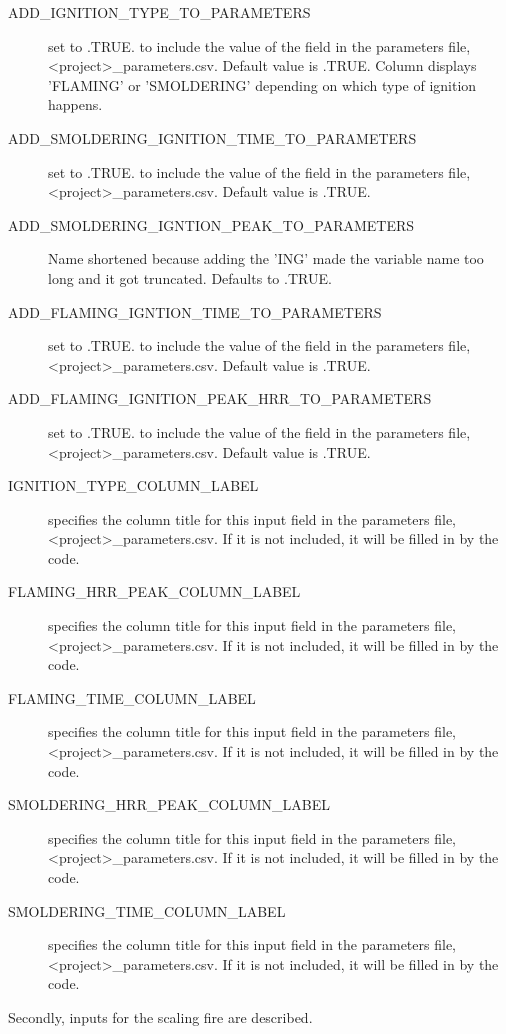 \documentclass[12pt,twoside]{book}
\begin{document}
\begin{description}
  \item[ADD\_IGNITION\_TYPE\_TO\_PARAMETERS] set to .TRUE. to include the value of the field in the parameters file, {\ct <project>\_parameters.csv}. Default value is .TRUE. Column displays 'FLAMING' or 'SMOLDERING' depending on which type of ignition happens.
  \item[ADD\_SMOLDERING\_IGNITION\_TIME\_TO\_PARAMETERS] set to .TRUE. to include the value of the field in the parameters file, {\ct <project>\_parameters.csv}. Default value is .TRUE.
  \item[ADD\_SMOLDERING\_IGNTION\_PEAK\_TO\_PARAMETERS] Name shortened because adding the 'ING' made the variable name too long and it got truncated. Defaults to {\ct .TRUE.}
  \item[ADD\_FLAMING\_IGNTION\_TIME\_TO\_PARAMETERS] set to .TRUE. to include the value of the field in the parameters file, {\ct <project>\_parameters.csv}. Default value is .TRUE.
  \item[ADD\_FLAMING\_IGNITION\_PEAK\_HRR\_TO\_PARAMETERS] set to .TRUE. to include the value of the field in the parameters file, {\ct <project>\_parameters.csv}. Default value is .TRUE.
  \item[IGNITION\_TYPE\_COLUMN\_LABEL] specifies the column title for this input field in the parameters file, {\ct <project>\_parameters.csv}. If it is not included, it will be filled in by the code.
  \item[FLAMING\_HRR\_PEAK\_COLUMN\_LABEL] specifies the column title for this input field in the parameters file, {\ct <project>\_parameters.csv}. If it is not included, it will be filled in by the code.
  \item[FLAMING\_TIME\_COLUMN\_LABEL] specifies the column title for this input field in the parameters file, {\ct <project>\_parameters.csv}. If it is not included, it will be filled in by the code.
  \item[SMOLDERING\_HRR\_PEAK\_COLUMN\_LABEL] specifies the column title for this input field in the parameters file, {\ct <project>\_parameters.csv}. If it is not included, it will be filled in by the code.
  \item[SMOLDERING\_TIME\_COLUMN\_LABEL] specifies the column title for this input field in the parameters file, {\ct <project>\_parameters.csv}. If it is not included, it will be filled in by the code.
 \end{description}
Secondly, inputs for the scaling fire are described.
\end{document}
